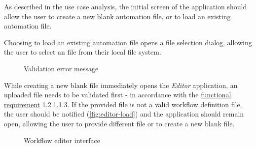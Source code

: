 As described in the use case analysis, the initial screen of the application should allow the user to create a new blank automation file, or to load an existing automation file.

Choosing to load an existing automation file opens a file selection dialog, allowing the user to select an file from their local file system.

\begin{figure}[!h]
    \begin{center}
    \end{center}
    \caption{Validation error message}\label{fig:editor-load}
\end{figure}
While creating a new blank file immediately opens the \textit{Editor} application, an uploaded file needs to be validated first - in accordance with the \hyperref[requirements]{functional requirement} 1.2.1.1.3.
If the provided file is not a valid workflow definition file, the user should be notified (\autoref{fig:editor-load}) and the application should remain open, allowing the user to provide different file or to create a new blank file.

\begin{figure}[h!]
    \begin{center}
    \end{center}
    \caption{Workflow editor interface} \label{fig:editor-workflow}
\end{figure}

